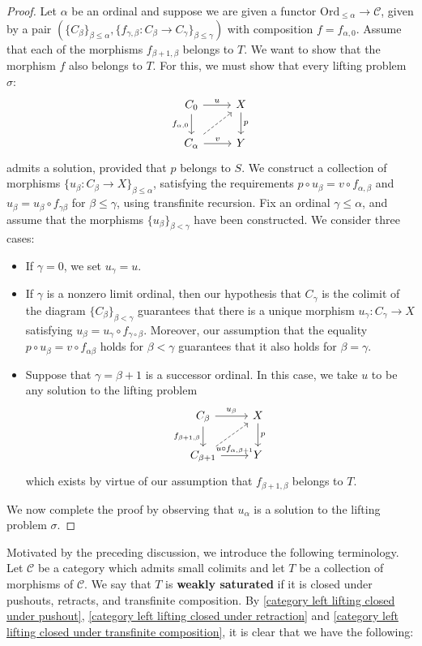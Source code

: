 \begin{proof}
Let $\alpha$ be an ordinal and suppose we are given a functor $\mathrm{Ord}_{\leq\alpha}\to\mathcal{C}$, given by a pair $(\{C_\beta\}_{\beta\leq\alpha},\{f_{\gamma,\beta}:C_\beta\to C_\gamma\}_{\beta\leq\gamma})$ with composition $f=f_{\alpha,0}$. Assume that each of the morphisms $f_{\beta+1,\beta}$ belongs to $T$. We want to show that the morphism $f$ also belongs to $T$. For this, we must show that every lifting problem $\sigma$:
\[\begin{tikzcd}
C_0\ar[r,"u"]\ar[d,swap,"f_{\alpha,0}"]&X\ar[d,"p"]\\
C_\alpha\ar[r,"v"]\ar[ru,dashed]&Y
\end{tikzcd}\]
admits a solution, provided that $p$ belongs to $S$. We construct a collection of morphisms $\{u_\beta:C_\beta\to X\}_{\beta\leq\alpha}$, satisfying the requirements $p\circ u_\beta=v\circ f_{\alpha,\beta}$ and $u_\beta=u_\beta\circ f_{\gamma\beta}$ for $\beta\leq\gamma$, using transfinite recursion. Fix an ordinal $\gamma\leq\alpha$, and assume that the morphisms $\{u_\beta\}_{\beta<\gamma}$ have been constructed. We consider three cases:
\begin{itemize}
\item If $\gamma=0$, we set $u_\gamma=u$.
\item If $\gamma$ is a nonzero limit ordinal, then our hypothesis that $C_\gamma$ is the colimit of the diagram $\{C_\beta\}_{\beta<\gamma}$ guarantees that there is a unique morphism $u_\gamma:C_\gamma\to X$ satisfying $u_\beta=u_\gamma\circ f_{\gamma\circ\beta}$. Moreover, our assumption that the equality $p\circ u_\beta=v\circ f_{\alpha\beta}$ holds for $\beta<\gamma$ guarantees that it also holds for $\beta=\gamma$.
\item Suppose that $\gamma=\beta+1$ is a successor ordinal. In this case, we take $u$ to be any solution to the lifting problem
\[\begin{tikzcd}
C_\beta\ar[r,"u_\beta"]\ar[d,swap,"f_{\beta+1,\beta}"]&X\ar[d,"p"]\\
C_{\beta+1}\ar[ru,dashed]\ar[r,"u\circ f_{\alpha,\beta+1}"]&Y
\end{tikzcd}\]
which exists by virtue of our assumption that $f_{\beta+1,\beta}$ belongs to $T$.
\end{itemize}
We now complete the proof by observing that $u_\alpha$ is a solution to the lifting problem $\sigma$.
\end{proof}
Motivated by the preceding discussion, we introduce the following terminology. Let $\mathcal{C}$ be a category which admits small colimits and let $T$ be a collection of morphisms of $\mathcal{C}$. We say that $T$ is \textbf{weakly saturated} if it is closed under pushouts, retracts, and transfinite composition. By \cref{category left lifting closed under pushout}, \cref{category left lifting closed under retraction} and \cref{category left lifting closed under transfinite composition}, it is clear that we have the following:
